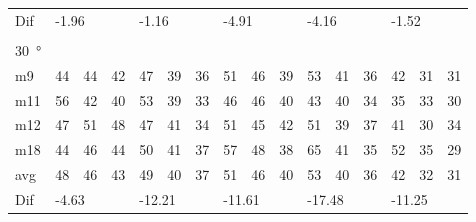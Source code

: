 \begin{table}[H]
\begin{tabular}{l|l|l|l|l|l|l|l|l|l|l|l|l|lll}
Dif & \multicolumn{3}{l|}{-1.96} & \multicolumn{3}{l|}{-1.16} & \multicolumn{3}{l|}{-4.91} & \multicolumn{3}{l|}{-4.16} & \multicolumn{3}{l}{-1.52}  \\ 
 \multicolumn{16}{l}{ } \\                         
\SI{30}{\degree}   & \multicolumn{3}{l|}{} & \multicolumn{3}{l|}{} & \multicolumn{3}{l|}{} & \multicolumn{3}{l|}{} & \multicolumn{3}{l}{}   \\  \hline
m9    &  44    &  44    &  42    &  47    &  39    &   36   &  51    &   46    &  39    &   53    &   41   &   36   & \multicolumn{1}{l|}{42} & \multicolumn{1}{l|}{31} & 31 \\
m11  &  56    &  42    &  40    &   53   &   39   &   33   &  46    &   46    &  40    &    43   &   40   &  34   & \multicolumn{1}{l|}{35} & \multicolumn{1}{l|}{33} & 30 \\
m12  &  47    &   51   &  48    &  47    &   41   &   34   &   51   &  45     &   42   &    51   &   39   &   37   & \multicolumn{1}{l|}{41} & \multicolumn{1}{l|}{30} & 34 \\
m18  &  44    &   46   &  44    &   50   &  41    &   37   &   57   &   48    &  38    &    65   &  41    &   35   & \multicolumn{1}{l|}{52} & \multicolumn{1}{l|}{35} & 29 \\ \hline
avg &  48    &  46    &  43    &  49    & 40     &  37    &   51   &  46     &  40    &  53     &   40   &  36    & \multicolumn{1}{l|}{42} & \multicolumn{1}{l|}{32}  & 31 \\ \hline  
Dif & \multicolumn{3}{l|}{-4.63} & \multicolumn{3}{l|}{-12.21} & \multicolumn{3}{l|}{-11.61} & \multicolumn{3}{l|}{-17.48} & \multicolumn{3}{l}{-11.25}                                
\end{tabular}
\end{table}



